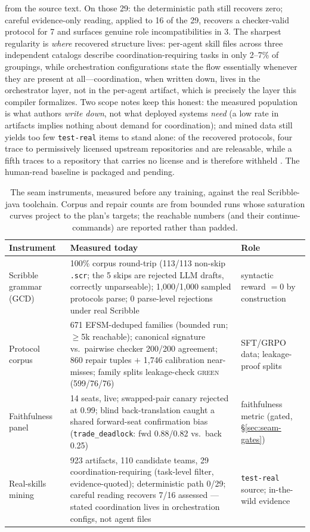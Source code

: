 \documentclass{article}
\begin{document}
from the source text. On those 29: the deterministic path still recovers zero; careful evidence-only reading, applied to 16 of the 29, recovers a checker-valid protocol for 7 and surfaces genuine role incompatibilities in 3. The sharpest regularity is \emph{where} recovered structure lives: per-agent skill files across three independent catalogs describe coordination-requiring tasks in only 2--7\% of groupings, while orchestration configurations state the flow essentially whenever they are present at all---coordination, when written down, lives in the orchestrator layer, not in the per-agent artifact, which is precisely the layer this compiler formalizes. Two scope notes keep this honest: the measured population is what authors \emph{write down}, not what deployed systems \emph{need} (a low rate in artifacts implies nothing about demand for coordination); and mined data still yields too few \texttt{test-real} items to stand alone: of the recovered protocols, four trace to permissively licensed upstream repositories and are releasable, while a fifth traces to a repository that carries no license and is therefore withheld \citep{minedskillssources}. The human-read baseline is packaged and pending.

\begin{table}[t]
\centering\small
\caption{The seam instruments, measured before any training, against the real Scribble-java toolchain. Corpus and repair counts are from bounded runs whose saturation curves project to the plan's targets; the reachable numbers (and their continue-commands) are reported rather than padded.}
\label{tab:seam-instruments}
\begin{tabular}{@{}p{2.7cm}p{9.1cm}p{1.9cm}@{}}
\toprule
\textbf{Instrument} & \textbf{Measured today} & \textbf{Role} \\
\midrule
Scribble grammar (GCD) & 100\% corpus round-trip (113/113 non-skip \texttt{.scr}; the 5 skips are rejected LLM drafts, correctly unparseable); 1{,}000/1{,}000 sampled protocols parse; 0 parse-level rejections under real Scribble & syntactic reward $=0$ by construction \\
Protocol corpus & 671 EFSM-deduped families (bounded run; $\geq$5k reachable); canonical signature vs.\ pairwise checker 200/200 agreement; 860 repair tuples $+$ 1{,}746 calibration near-misses; family splits leakage-check \textsc{green} (599/76/76) & SFT/GRPO data; leakage-proof splits \\
Faithfulness panel & 14 seats, live; swapped-pair canary rejected at 0.99; blind back-translation caught a shared forward-seat confirmation bias (\texttt{trade\_deadlock}: fwd 0.88/0.82 vs.\ back 0.25) & faithfulness metric (gated, \S\ref{sec:seam-gates}) \\
Real-skills mining & 923 artifacts, 110 candidate teams, 29 coordination-requiring (task-level filter, evidence-quoted); deterministic path 0/29; careful reading recovers 7/16 assessed --- stated coordination lives in orchestration configs, not agent files & \texttt{test-real} source; in-the-wild evidence \\
\bottomrule
\end{tabular}
\end{table}
\end{document}
